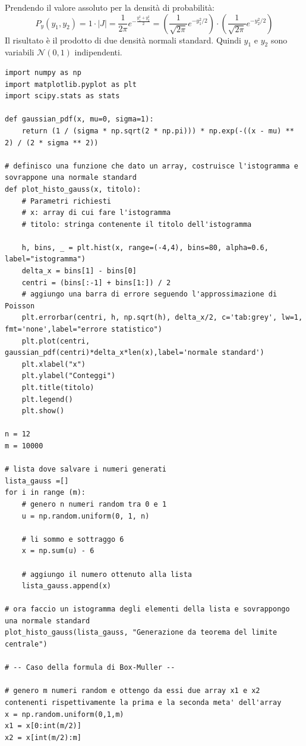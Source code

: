 \documentclass[openany,a4paper,12pt]{book}
\theoremstyle{remark}
\begin{document}
Prendendo il valore assoluto per la densità di probabilità:
\begin{equation}
P_y(y_1, y_2) = 1 \cdot |J| = \frac{1}{2\pi} e^{-\frac{y_1^2 + y_2^2}{2}} = \left(\frac{1}{\sqrt{2\pi}}e^{-y_1^2/2}\right) \cdot \left(\frac{1}{\sqrt{2\pi}}e^{-y_2^2/2}\right)
\end{equation}
Il risultato è il prodotto di due densità normali standard. Quindi $y_1$ e $y_2$ sono variabili $\mathcal{N}(0,1)$ indipendenti.


\begin{lstlisting}[caption={Generazione numeri casuali: Teorema del Limite Centrale e Box-Muller}]
import numpy as np
import matplotlib.pyplot as plt
import scipy.stats as stats

def gaussian_pdf(x, mu=0, sigma=1):
    return (1 / (sigma * np.sqrt(2 * np.pi))) * np.exp(-((x - mu) ** 2) / (2 * sigma ** 2))

# definisco una funzione che dato un array, costruisce l'istogramma e sovrappone una normale standard
def plot_histo_gauss(x, titolo):
    # Parametri richiesti
    # x: array di cui fare l'istogramma
    # titolo: stringa contenente il titolo dell'istogramma

    h, bins, _ = plt.hist(x, range=(-4,4), bins=80, alpha=0.6, label="istogramma")
    delta_x = bins[1] - bins[0]
    centri = (bins[:-1] + bins[1:]) / 2
    # aggiungo una barra di errore seguendo l'approssimazione di Poisson
    plt.errorbar(centri, h, np.sqrt(h), delta_x/2, c='tab:grey', lw=1, fmt='none',label="errore statistico")
    plt.plot(centri, gaussian_pdf(centri)*delta_x*len(x),label='normale standard')
    plt.xlabel("x")
    plt.ylabel("Conteggi")
    plt.title(titolo)
    plt.legend()
    plt.show()

n = 12
m = 10000

# lista dove salvare i numeri generati
lista_gauss =[]
for i in range (m):
    # genero n numeri random tra 0 e 1
    u = np.random.uniform(0, 1, n)

    # li sommo e sottraggo 6
    x = np.sum(u) - 6

    # aggiungo il numero ottenuto alla lista
    lista_gauss.append(x)

# ora faccio un istogramma degli elementi della lista e sovrappongo una normale standard
plot_histo_gauss(lista_gauss, "Generazione da teorema del limite centrale")

# -- Caso della formula di Box-Muller --

# genero m numeri random e ottengo da essi due array x1 e x2 contenenti rispettivamente la prima e la seconda meta' dell'array
x = np.random.uniform(0,1,m)
x1 = x[0:int(m/2)]
x2 = x[int(m/2):m]


\end{lstlisting}
\end{document}
